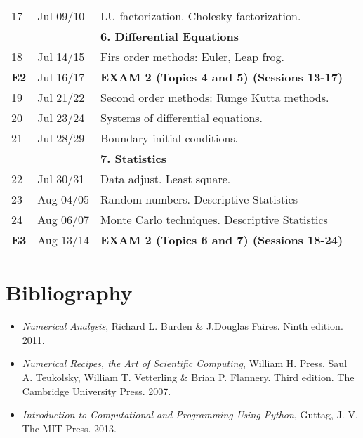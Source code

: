\documentclass[a4,useAMS,usenatbib,usegraphicx,12pt]{article}
\begin{document}
\begin{table}[!ht]
\begin{small}
\begin{flushleft}
\begin{center}
\begin{tabular}{l  l  l}
	17 & Jul 09/10& LU factorization. Cholesky factorization. \\
	& & \textbf{6. Differential Equations} \\
	18 & Jul 14/15& Firs order methods: Euler, Leap frog. \\
	\textbf{E2} & Jul 16/17& \textbf{EXAM 2 (Topics 4 and 5) (Sessions 13-17)} \\
	19 & Jul 21/22& Second order methods: Runge Kutta methods. \\
	20 & Jul 23/24& Systems of differential equations.\\
	21 & Jul 28/29& Boundary initial conditions.\\
	& & \textbf{7. Statistics} \\
	22 & Jul 30/31&  Data adjust. Least square.\\
	23 & Aug 04/05&  Random numbers. Descriptive Statistics\\
	24 & Aug 06/07&  Monte Carlo techniques. Descriptive Statistics\\
	\textbf{E3} & Aug 13/14& \textbf{EXAM 2 (Topics 6 and 7) (Sessions 18-24)} \\
	\hline\hline
  \end{tabular}  
\end{center}
\end{flushleft}
\end{small}
\end{table}

\newpage
\section*{Bibliography}
\begin{itemize}
\item \textit{Numerical Analysis}, Richard L. Burden \& J.Douglas Faires. Ninth edition. 2011.
\item \textit{Numerical Recipes, the Art of Scientific Computing}, William H. Press, Saul A. Teukolsky,
William T. Vetterling \& Brian P. Flannery. Third edition. The Cambridge University Press. 2007.
\item \textit{Introduction to Computational and Programming Using Python}, Guttag, J. V. 
The MIT Press. 2013.
\end{itemize}

\end{document}
